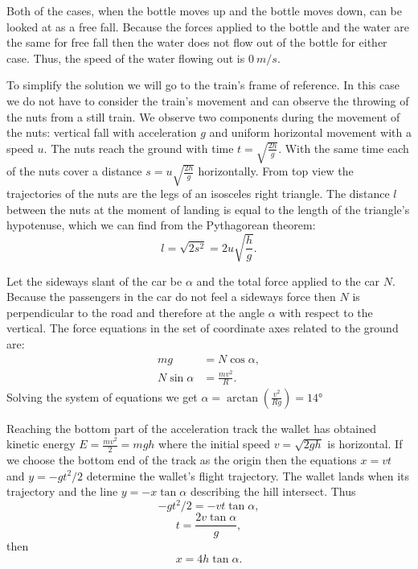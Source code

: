 \documentclass[11pt]{article}
\begin{document}
\solueng
Both of the cases, when the bottle moves up and the bottle moves down, can be looked at as a free fall. Because the forces applied to the bottle and the water are the same for free fall then the water does not flow out of the bottle for either case. Thus, the speed of the water flowing out is $\SI{0}{m/s}$.
\probend
\bigskip


\solueng
To simplify the solution we will go to the train’s frame of reference. In this case we do not have to consider the train’s movement and can observe the throwing of the nuts from a still train. We observe two components during the movement of the nuts: vertical fall with acceleration $g$ and uniform horizontal movement with a speed $u$. The nuts reach the ground with time $t=\sqrt{\frac{2h}{g}}$. With the same time each of the nuts cover a distance $s=u\sqrt{\frac{2h}{g}}$ horizontally. From top view the trajectories of the nuts are the legs of an isosceles right triangle. The distance $l$ between the nuts at the moment of landing is equal to the length of the triangle’s hypotenuse, which we can find from the Pythagorean theorem: 
\[ l=\sqrt{2s^2}=2u\sqrt{\frac{h}{g}}. \]
\probend
\bigskip


\solueng
Let the sideways slant of the car be $\alpha$ and the total force applied to the car $N$. Because the passengers in the car do not feel a sideways force then $N$ is perpendicular to the road and therefore at the angle $\alpha$ with respect to the vertical. The force equations in the set of coordinate axes related to the ground are: 
\begin{align*}
mg &= N\cos \alpha,\\
N\sin\alpha &= \frac{mv^2}{R}.
\end{align*}
Solving the system of equations we get $\alpha = \arctan(\frac{v^2}{Rg}) = \ang{14}$
\probend
\bigskip


\solueng
Reaching the bottom part of the acceleration track the wallet has obtained kinetic energy $E=\frac{mv^2}{2}=mgh$ where the initial speed $v=\sqrt{2gh}$ is horizontal. If we choose the bottom end of the track as the origin then the equations $x=vt$ and $y=-gt^2 / 2$ determine the wallet’s flight trajectory. The wallet lands when its trajectory and the line $y=-x\tan\alpha$ describing the hill intersect. Thus
$$-gt^2 / 2=-vt\tan\alpha,$$
$$t=\frac{2v \tan \alpha}{g},$$
then $$x=4h \tan\alpha.$$
\probend
\bigskip
\end{document}
